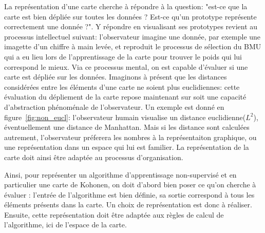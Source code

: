 La représentation d'une carte cherche à répondre à la question: "est-ce que la carte est bien dépliée sur toutes les données ? Est-ce qu'un prototype représente correctement une donnée ?". Y répondre en visualisant ses prototypes revient au processus intellectuel suivant: l'observateur imagine une donnée, par exemple une imagette d'un chiffre à main levée, et reproduit le processus de sélection du BMU qui a eu lieu lors de l'apprentissage de la carte pour trouver le poids qui lui correspond le mieux. Via ce processus mental, on est capable d'évaluer si une carte est dépliée sur les données. 
Imaginons à présent que les distances considérées entre les éléments d'une carte ne soient plus euclidiennes: cette évaluation du dépliement de la carte repose maintenant sur soit une capacité d'abstraction phénoménale de l'observateur. Un exemple est donné en figure~\ref{fig:non_eucl}: l'observateur humain visualise un distance euclidienne($L^2$), éventuellement une distance de Manhattan. Mais si les distance sont calculées autrement, l'observateur préferera les nombres à la représentaiton graphique, ou une représentation dans un espace qui lui est familier. La représentation de la carte doit ainsi être adaptée au processus d'organisation.

 
Ainsi, pour représenter un algorithme d'apprentissage non-supervisé et en particulier une carte de Kohonen, on doit d'abord bien poser ce qu'on cherche à évaluer : l'entrée de l'algorithme est bien définie, sa sortie correspond à tous les éléments présents dans la carte. Un choix de représentation est donc à réaliser. Ensuite, cette représentation doit être adaptée aux règles de calcul de l'algorithme, ici de l'espace de la carte. 

